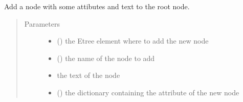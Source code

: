\documentclass[a4paper,10pt,english]{sphinxmanual}
\begin{document}

\begin{fulllineitems}
\label{\detokenize{commands/apidoc/src:src.xmlManager.add_simple_node}}
Add a node with some attibutes and text to the root node.
\begin{quote}\begin{description}
\item[{Parameters}] \leavevmode\begin{itemize}
\item {} 
 () \textendash{} the Etree element where to add the new node

\item {} 
 () \textendash{} the name of the node to add

\item {} 
 \textendash{} the text of the node

\item {} 
 () \textendash{} the dictionary containing the 
attribute of the new node

\end{itemize}

\end{description}\end{quote}

\end{fulllineitems}

\end{document}
